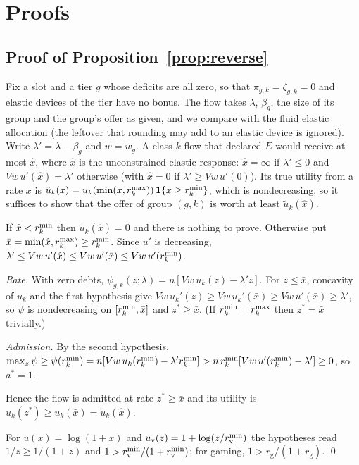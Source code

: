 \section{Proofs}\label{app:proofs}

\subsection{Proof of Proposition~\ref{prop:reverse}}\label{app:reverse}

Fix a slot and a tier $g$ whose deficits are all zero, so that $\pi_{g,k}=\zeta_{g,k}=0$ and elastic devices of the tier have no bonus.
The flow takes $\lambda$, $\beta_g$, the size of its group and the group's offer as given, and we compare with the fluid elastic allocation (the leftover that rounding may add to an elastic device is ignored).
Write $\lambda'=\lambda-\beta_g$ and $w=w_g$.
A class-$k$ flow that declared $E$ would receive at most $\hat x$, where $\hat x$ is the unconstrained elastic response: $\hat x=\infty$ if $\lambda'\le0$ and $Vw\,u'(\hat x)=\lambda'$ otherwise (with $\hat x=0$ if $\lambda'\ge Vw\,u'(0)$).
Its true utility from a rate $x$ is $\tilde u_k(x)=u_k(\min(x,r^{\max}_k))\,\mathbf{1}\{x\ge r^{\min}_k\}$, which is nondecreasing, so it suffices to show that the offer of group $(g,k)$ is worth at least $\tilde u_k(\hat x)$.

If $\hat x<r^{\min}_k$ then $\tilde u_k(\hat x)=0$ and there is nothing to prove.
Otherwise put $\bar x=\min(\hat x,r^{\max}_k)\ge r^{\min}_k$.
Since $u'$ is decreasing, $\lambda'\le Vw\,u'(\hat x)\le Vw\,u'(\bar x)\le Vw\,u'(r^{\min}_k)$.

\emph{Rate.} With zero debts, $\psi_{g,k}(z;\lambda)=n[Vw\,u_k(z)-\lambda'z]$. For $z\le\bar x$, concavity of $u_k$ and the first hypothesis give $Vw\,u_k'(z)\ge Vw\,u_k'(\bar x)\ge Vw\,u'(\bar x)\ge\lambda'$, so $\psi$ is nondecreasing on $[r^{\min}_k,\bar x]$ and $z^*\ge\bar x$. (If $r^{\min}_k=r^{\max}_k$ then $z^*=\bar x$ trivially.)

\emph{Admission.} By the second hypothesis, $\max_z\psi\ge\psi(r^{\min}_k)=n[Vw\,u_k(r^{\min}_k)-\lambda'r^{\min}_k]>n\,r^{\min}_k[Vw\,u'(r^{\min}_k)-\lambda']\ge0$, so $a^*=1$.

Hence the flow is admitted at rate $z^*\ge\bar x$ and its utility is $u_k(z^*)\ge u_k(\bar x)=\tilde u_k(\hat x)$.

For $u(x)=\log(1+x)$ and $u_{\mathrm{v}}(z)=1+\log(z/r^{\min}_{\mathrm{v}})$ the hypotheses read $1/z\ge1/(1+z)$ and $1>r^{\min}_{\mathrm{v}}/(1+r^{\min}_{\mathrm{v}})$; for gaming, $1>r_{\mathrm{g}}/(1+r_{\mathrm{g}})$. \qed

